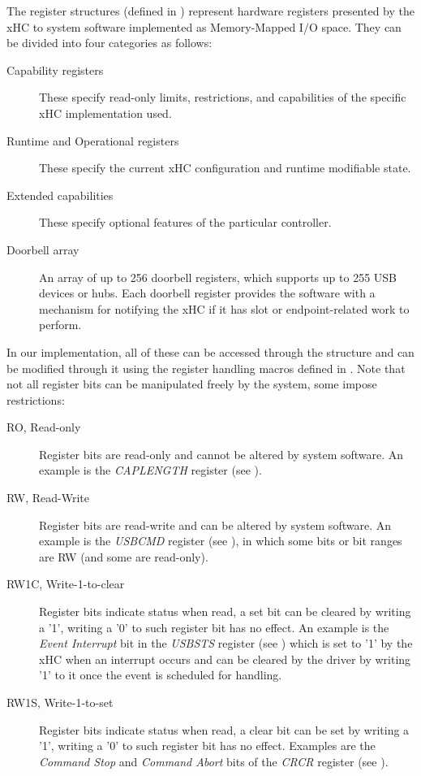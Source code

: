 The register structures (defined in )
represent hardware registers presented by the xHC to system software
implemented as Memory-Mapped I/O space. They can be divided into four categories as follows:
%
\begin{description}
	\item[Capability registers]
		These specify read-only limits, restrictions, and capabilities of the specific
		xHC implementation used.
	\item[Runtime and Operational registers]
		These specify the current xHC configuration and runtime modifiable state.
	\item[Extended capabilities]
		These specify optional features of the particular controller.
	\item[Doorbell array]
		An array of up to 256 doorbell registers, which supports up to 255 USB devices
		or hubs. Each doorbell register provides the software with a mechanism for
		notifying the xHC if it has slot or endpoint-related work to perform.
\end{description}

In our implementation, all of these can be accessed through the  structure and
can be modified through it using the register handling macros defined in
. Note that not all register bits can be
manipulated freely by the system, some impose restrictions:
%
\begin{description}
	\item[RO, Read-only]
		Register bits are read-only and cannot be altered by system software. An example
		is the \textit{CAPLENGTH} register (see ).
	\item[RW, Read-Write]
		Register bits are read-write and can be altered by system software. An example
		is the \textit{USBCMD} register (see ), in which some bits or bit ranges
		are RW (and some are read-only).
	\item[RW1C, Write-1-to-clear]
		Register bits indicate status when read, a set bit can be cleared by writing
		a '1', writing a '0' to such register bit has no effect. An example is
		the \textit{Event Interrupt} bit in the \textit{USBSTS} register (see ) which is set
		to '1' by the xHC when an interrupt occurs and can be cleared by the driver
		by writing '1' to it once the event is scheduled for handling.
	\item[RW1S, Write-1-to-set]
		Register bits indicate status when read, a clear bit can be set by writing
		a '1', writing a '0' to such register bit has no effect. Examples are the
		\textit{Command Stop} and \textit{Command Abort} bits of the \textit{CRCR} register
		(see ).
\end{description}

